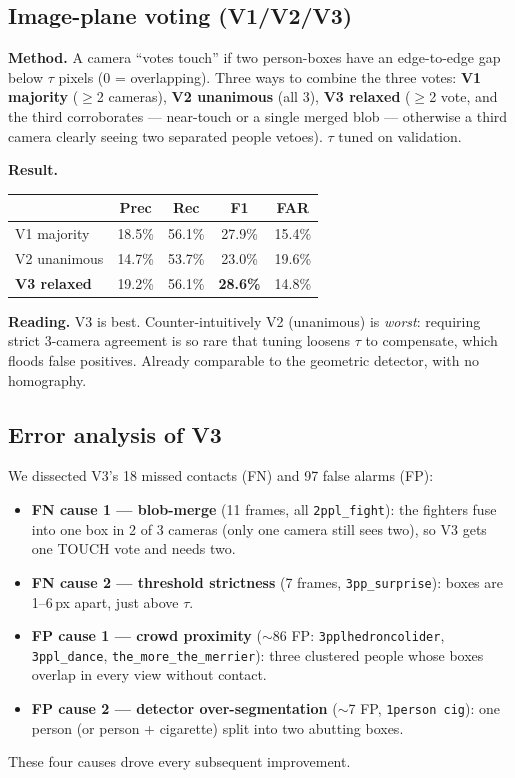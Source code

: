 \documentclass[11pt, a4paper]{article}
\begin{document}
\subsection{Image-plane voting (V1/V2/V3)}
\label{sec:v3}
\textbf{Method.} A camera ``votes touch'' if two person-boxes have an
edge-to-edge gap below $\tau$ pixels (0 = overlapping). Three ways to combine the
three votes: \textbf{V1 majority} ($\ge$2 cameras), \textbf{V2 unanimous} (all 3),
\textbf{V3 relaxed} ($\ge$2 vote, and the third corroborates --- near-touch or a
single merged blob --- otherwise a third camera clearly seeing two separated
people vetoes). $\tau$ tuned on validation.

\textbf{Result.}
\begin{center}\renewcommand{\arraystretch}{1.15}
\begin{tabular}{l c c c c}
\toprule
& \textbf{Prec} & \textbf{Rec} & \textbf{F1} & \textbf{FAR} \\
\midrule
V1 majority   & 18.5\% & 56.1\% & 27.9\% & 15.4\% \\
V2 unanimous  & 14.7\% & 53.7\% & 23.0\% & 19.6\% \\
\textbf{V3 relaxed} & 19.2\% & 56.1\% & \textbf{28.6\%} & 14.8\% \\
\bottomrule
\end{tabular}\end{center}

\textbf{Reading.} V3 is best. Counter-intuitively V2 (unanimous) is \emph{worst}:
requiring strict 3-camera agreement is so rare that tuning loosens $\tau$ to
compensate, which floods false positives. Already comparable to the geometric
detector, with no homography.

\subsection{Error analysis of V3}
\label{sec:erranalysis}
We dissected V3's 18 missed contacts (FN) and 97 false alarms (FP):
\begin{itemize}[leftmargin=1.4em, itemsep=1pt]
\item \textbf{FN cause 1 --- blob-merge} (11 frames, all \texttt{2ppl\_fight}):
      the fighters fuse into one box in 2 of 3 cameras (only one camera still
      sees two), so V3 gets one TOUCH vote and needs two.
\item \textbf{FN cause 2 --- threshold strictness} (7 frames,
      \texttt{3pp\_surprise}): boxes are 1--6\,px apart, just above $\tau$.
\item \textbf{FP cause 1 --- crowd proximity} ($\sim$86 FP: \texttt{3pplhedroncolider},
      \texttt{3ppl\_dance}, \texttt{the\_more\_the\_merrier}): three clustered
      people whose boxes overlap in every view without contact.
\item \textbf{FP cause 2 --- detector over-segmentation} ($\sim$7 FP,
      \texttt{1person~cig}): one person (or person + cigarette) split into two
      abutting boxes.
\end{itemize}
These four causes drove every subsequent improvement.
\end{document}
